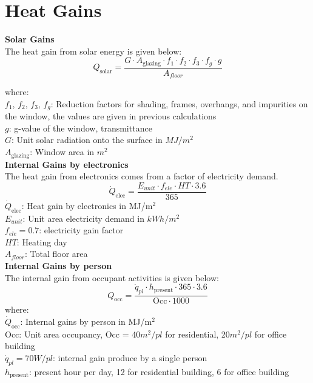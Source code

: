 \documentclass[a4paper, oneside]{discothesis}
\begin{document}
	\section{Heat Gains}
	\textbf{Solar Gains}\\
	The heat gain from solar energy is given below: \\
	\[Q_{\text{solar}} = \frac{G \cdot A_{\text{glazing}} \cdot f_1 \cdot f_2 \cdot f_3 \cdot f_g \cdot g}{A_{floor}} \]

	where:\\
	$f_1$, $f_2$, $f_3$, $f_g$: Reduction factors for shading, frames, overhangs, and impurities on the window, the values are given in previous calculations\\
	$g$: g-value of the window, transmittance\\
	$G$: Unit solar radiation onto the surface in $MJ/m^2$\\
	$A_{\text{glazing}}$: Window area in $m^2$\\

	
	\textbf{Internal Gains by electronics}\\
	The heat gain from electronics comes from a factor of electricity demand.
	\[\dot{Q}_{\text{elec}} = \frac{E_{unit}  \cdot f_{ele} \cdot HT \cdot 3.6}{365} \]
	$\dot{Q}_{\text{elec}}$: Heat gain by electronics in MJ/m$^2$\\
	$E_{unit}$: Unit area electricity demand in $kWh/m^2$\\
	$f_{ele} = 0.7$: electricity gain factor\\
	$HT$: Heating day\\
	$A_{floor}$: Total floor area\\


	\textbf{Internal Gains by person}\\
	The internal gain from occupant activities is given below:\\

	\[Q_{\text{occ}} = \frac{\dot{q}_{pl} \cdot h_{\text{present}} \cdot 365 \cdot 3.6}{\text{Occ} \cdot  1000}\]
	where:\\
	$\dot{Q}_{\text{occ}}$: Internal gains by person in MJ/m$^2$\\
	$\text{Occ}$: Unit area occupancy, Occ = 40$m^2/pl$ for residential, 20$m^2/pl$ for office building\\
	$\dot{q}_{pl} = 70W/pl$: internal gain produce by a single person\\
	$h_{\text{present}}$: present hour per day, 12 for residential building, 6 for office building\\
\end{document}
